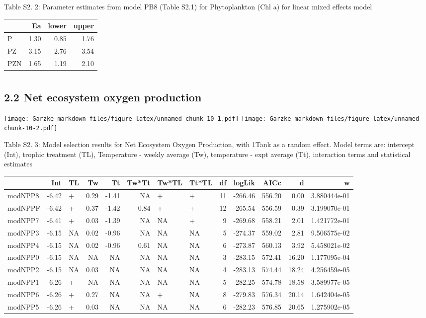 \documentclass[]{article}
\begin{document}
Table S2. 2: Parameter estimates from model PB8 (Table S2.1) for
Phytoplankton (Chl a) for linear mixed effects model

\begin{longtable}[]{@{}lrrr@{}}
\toprule
& Ea & lower & upper\tabularnewline
\midrule
\endhead
P & 1.30 & 0.85 & 1.76\tabularnewline
PZ & 3.15 & 2.76 & 3.54\tabularnewline
PZN & 1.65 & 1.19 & 2.10\tabularnewline
\bottomrule
\end{longtable}

\section{}\label{section}

\subsection{2.2 Net ecosystem oxygen
production}\label{net-ecosystem-oxygen-production}

\texttt{[image: Garzke\_markdown\_files/figure-latex/unnamed-chunk-10-1.pdf]}
\texttt{[image: Garzke\_markdown\_files/figure-latex/unnamed-chunk-10-2.pdf]}

Table S2. 3: Model selection results for Net Ecosystem Oxygen
Production, with 1\textbar{}Tank as a random effect. Model terms are:
intercept (Int), trophic treatment (TL), Temperature - weekly average
(Tw), temperature - expt average (Tt), interaction terms and statistical
estimates

\begin{longtable}[]{@{}lrlrrrllrrrrr@{}}
\toprule
& Int & TL & Tw & Tt & Tw*Tt & Tw*TL & Tt*TL & df & logLik & AICc & d &
w\tabularnewline
\midrule
\endhead
modNPP8 & -6.42 & + & 0.29 & -1.41 & NA & + & + & 11 & -266.46 & 556.20
& 0.00 & 3.880444e-01\tabularnewline
modNPPF & -6.42 & + & 0.37 & -1.42 & 0.84 & + & + & 12 & -265.54 &
556.59 & 0.39 & 3.199070e-01\tabularnewline
modNPP7 & -6.41 & + & 0.03 & -1.39 & NA & NA & + & 9 & -269.68 & 558.21
& 2.01 & 1.421772e-01\tabularnewline
modNPP3 & -6.15 & NA & 0.02 & -0.96 & NA & NA & NA & 5 & -274.37 &
559.02 & 2.81 & 9.506575e-02\tabularnewline
modNPP4 & -6.15 & NA & 0.02 & -0.96 & 0.61 & NA & NA & 6 & -273.87 &
560.13 & 3.92 & 5.458021e-02\tabularnewline
modNPP0 & -6.15 & NA & NA & NA & NA & NA & NA & 3 & -283.15 & 572.41 &
16.20 & 1.177095e-04\tabularnewline
modNPP2 & -6.15 & NA & 0.03 & NA & NA & NA & NA & 4 & -283.13 & 574.44 &
18.24 & 4.256459e-05\tabularnewline
modNPP1 & -6.26 & + & NA & NA & NA & NA & NA & 5 & -282.25 & 574.78 &
18.58 & 3.589977e-05\tabularnewline
modNPP6 & -6.26 & + & 0.27 & NA & NA & + & NA & 8 & -279.83 & 576.34 &
20.14 & 1.642404e-05\tabularnewline
modNPP5 & -6.26 & + & 0.03 & NA & NA & NA & NA & 6 & -282.23 & 576.85 &
20.65 & 1.275902e-05\tabularnewline
\bottomrule
\end{longtable}
\end{document}
